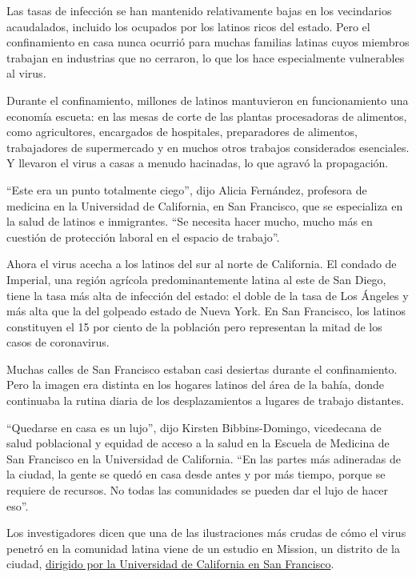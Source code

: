 Las tasas de infección se han mantenido relativamente bajas en los
vecindarios acaudalados, incluido los ocupados por los latinos ricos del
estado. Pero el confinamiento en casa nunca ocurrió para muchas familias
latinas cuyos miembros trabajan en industrias que no cerraron, lo que
los hace especialmente vulnerables al virus.

Durante el confinamiento, millones de latinos mantuvieron en
funcionamiento una economía escueta: en las mesas de corte de las
plantas procesadoras de alimentos, como agricultores, encargados de
hospitales, preparadores de alimentos, trabajadores de supermercado y en
muchos otros trabajos considerados esenciales. Y llevaron el virus a
casas a menudo hacinadas, lo que agravó la propagación.

``Este era un punto totalmente ciego'', dijo Alicia Fernández, profesora
de medicina en la Universidad de California, en San Francisco, que se
especializa en la salud de latinos e inmigrantes. ``Se necesita hacer
mucho, mucho más en cuestión de protección laboral en el espacio de
trabajo''.

Ahora el virus acecha a los latinos del sur al norte de California. El
condado de Imperial, una región agrícola predominantemente latina al
este de San Diego, tiene la tasa más alta de infección del estado: el
doble de la tasa de Los Ángeles y más alta que la del golpeado estado de
Nueva York. En San Francisco, los latinos constituyen el 15 por ciento
de la población pero representan la mitad de los casos de coronavirus.

Muchas calles de San Francisco estaban casi desiertas durante el
confinamiento. Pero la imagen era distinta en los hogares latinos del
área de la bahía, donde continuaba la rutina diaria de los
desplazamientos a lugares de trabajo distantes.

``Quedarse en casa es un lujo'', dijo Kirsten Bibbins-Domingo,
vicedecana de salud poblacional y equidad de acceso a la salud en la
Escuela de Medicina de San Francisco en la Universidad de California.
``En las partes más adineradas de la ciudad, la gente se quedó en casa
desde antes y por más tiempo, porque se requiere de recursos. No todas
las comunidades se pueden dar el lujo de hacer eso''.

Los investigadores dicen que una de las ilustraciones más crudas de cómo
el virus penetró en la comunidad latina viene de un estudio en Mission,
un distrito de la ciudad,
\href{https://www.ucsf.edu/news/2020/05/417356/initial-results-mission-district-covid-19-testing-announced}{dirigido
por la Universidad de California en San Francisco}.

